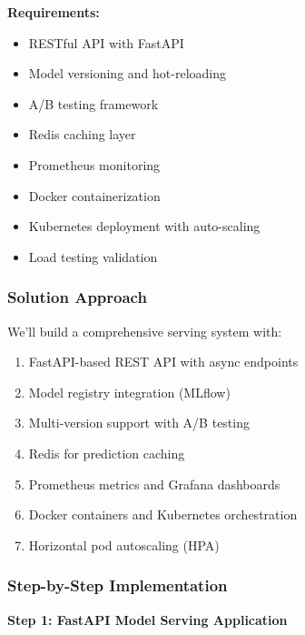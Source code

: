 \textbf{Requirements:}
\begin{itemize}
    \item RESTful API with FastAPI
    \item Model versioning and hot-reloading
    \item A/B testing framework
    \item Redis caching layer
    \item Prometheus monitoring
    \item Docker containerization
    \item Kubernetes deployment with auto-scaling
    \item Load testing validation
\end{itemize}

\subsubsection{Solution Approach}

We'll build a comprehensive serving system with:
\begin{enumerate}
    \item FastAPI-based REST API with async endpoints
    \item Model registry integration (MLflow)
    \item Multi-version support with A/B testing
    \item Redis for prediction caching
    \item Prometheus metrics and Grafana dashboards
    \item Docker containers and Kubernetes orchestration
    \item Horizontal pod autoscaling (HPA)
\end{enumerate}

\subsubsection{Step-by-Step Implementation}

\textbf{Step 1: FastAPI Model Serving Application}

